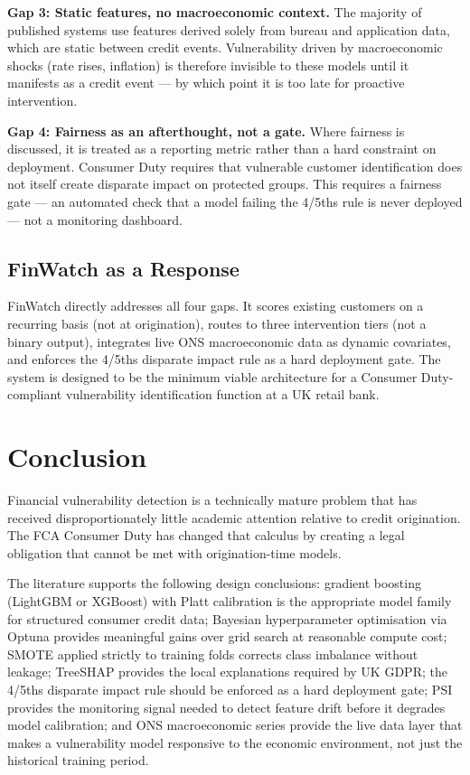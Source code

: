 \documentclass[12pt, a4paper]{article}
\begin{document}
\textbf{Gap 3: Static features, no macroeconomic context.}
The majority of published systems use features derived solely from bureau and
application data, which are static between credit events.
Vulnerability driven by macroeconomic shocks (rate rises, inflation) is therefore
invisible to these models until it manifests as a credit event --- by which point
it is too late for proactive intervention.

\textbf{Gap 4: Fairness as an afterthought, not a gate.}
Where fairness is discussed, it is treated as a reporting metric rather than a
hard constraint on deployment.
Consumer Duty requires that vulnerable customer identification does not itself
create disparate impact on protected groups.
This requires a fairness gate --- an automated check that a model failing the
4/5ths rule is never deployed --- not a monitoring dashboard.

\subsection{FinWatch as a Response}

FinWatch directly addresses all four gaps.
It scores existing customers on a recurring basis (not at origination),
routes to three intervention tiers (not a binary output),
integrates live ONS macroeconomic data as dynamic covariates,
and enforces the 4/5ths disparate impact rule as a hard deployment gate.
The system is designed to be the minimum viable architecture for a Consumer
Duty-compliant vulnerability identification function at a UK retail bank.

\section{Conclusion}

Financial vulnerability detection is a technically mature problem that has
received disproportionately little academic attention relative to credit
origination.
The FCA Consumer Duty has changed that calculus by creating a legal obligation
that cannot be met with origination-time models.

The literature supports the following design conclusions: gradient boosting
(LightGBM or XGBoost) with Platt calibration is the appropriate model family
for structured consumer credit data; Bayesian hyperparameter optimisation via
Optuna provides meaningful gains over grid search at reasonable compute cost;
SMOTE applied strictly to training folds corrects class imbalance without leakage;
TreeSHAP provides the local explanations required by UK GDPR; the 4/5ths
disparate impact rule should be enforced as a hard deployment gate; PSI provides
the monitoring signal needed to detect feature drift before it degrades
model calibration; and ONS macroeconomic series provide the live data layer
that makes a vulnerability model responsive to the economic environment,
not just the historical training period.
\end{document}
